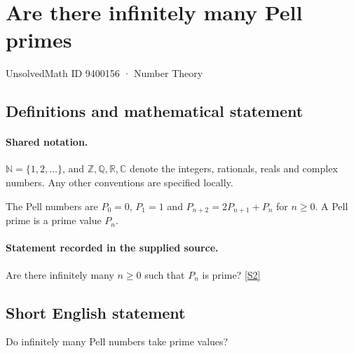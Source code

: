 \documentclass[11pt]{article}
\newcommand{\sref}[2]{\hyperlink{source:#1:#2}{[S#2]}}
\begin{document}
\setcounter{section}{9400155}
\section{Are there infinitely many Pell primes}\label{9400156}
{\small\sffamily UnsolvedMath ID 9400156 · Number Theory}
\subsection{Definitions and mathematical statement}

\paragraph{Shared notation.}$\mathbb N=\{1,2,\ldots\}$, and $\mathbb Z,\mathbb Q,\mathbb R,\mathbb C$ denote the integers, rationals, reals and complex numbers. Any other conventions are specified locally.


The Pell numbers are $P_0=0$, $P_1=1$ and $P_{n+2}=2P_{n+1}+P_n$ for $n\ge0$. A Pell prime is a prime value $P_n$.
\paragraph{Statement recorded in the supplied source.}
Are there infinitely many $n\ge0$ such that $P_n$ is prime? \sref{9400156}{2}
\subsection{Short English statement}
Do infinitely many Pell numbers take prime values?
\end{document}
